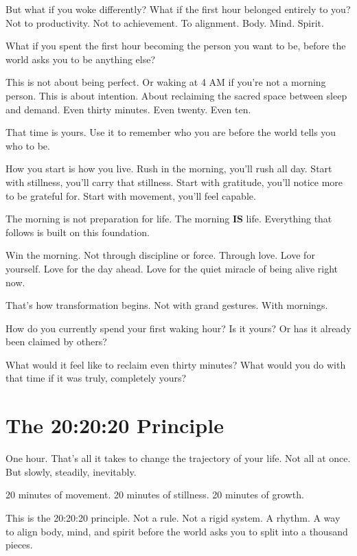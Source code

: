 \documentclass[11pt, a5paper, openright]{book}
\begin{document}
But what if you woke differently? What if the first hour belonged entirely to you? Not to productivity. Not to achievement. To alignment. Body. Mind. Spirit.

What if you spent the first hour becoming the person you want to be, before the world asks you to be anything else?

This is not about being perfect. Or waking at 4 AM if you're not a morning person. This is about intention. About reclaiming the sacred space between sleep and demand. Even thirty minutes. Even twenty. Even ten.

That time is yours. Use it to remember who you are before the world tells you who to be.

How you start is how you live. Rush in the morning, you'll rush all day. Start with stillness, you'll carry that stillness. Start with gratitude, you'll notice more to be grateful for. Start with movement, you'll feel capable.

The morning is not preparation for life. The morning \textbf{IS} life. Everything that follows is built on this foundation.

Win the morning. Not through discipline or force. Through love. Love for yourself. Love for the day ahead. Love for the quiet miracle of being alive right now.

That's how transformation begins. Not with grand gestures. With mornings.

\begin{reflectionbox}
How do you currently spend your first waking hour? Is it yours? Or has it already been claimed by others?

What would it feel like to reclaim even thirty minutes? What would you do with that time if it was truly, completely yours?
\end{reflectionbox}

\chapter{The 20:20:20 Principle}

One hour. That's all it takes to change the trajectory of your life. Not all at once. But slowly, steadily, inevitably.

20 minutes of movement. 20 minutes of stillness. 20 minutes of growth.

This is the 20:20:20 principle. Not a rule. Not a rigid system. A rhythm. A way to align body, mind, and spirit before the world asks you to split into a thousand pieces.
\end{document}
